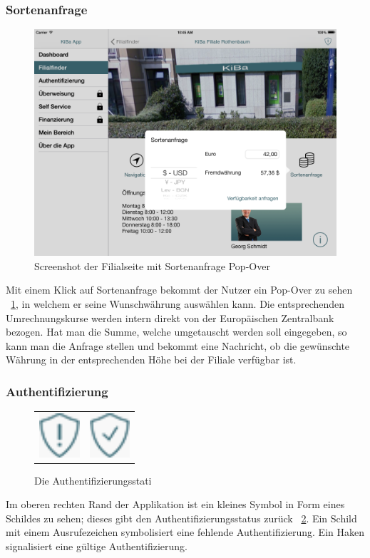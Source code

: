 \subsubsection{Sortenanfrage}
\begin{figure}[h!]
	\centering
	\includegraphics[height=0.25\textheight]{Pictures/Sortenanfrage}
	\vspace{-12pt}
	\caption{Screenshot der Filialseite mit Sortenanfrage Pop-Over}
	\label{fig3}
\end{figure}
	Mit einem Klick auf Sortenanfrage bekommt der Nutzer ein Pop-Over zu sehen ~\ref{fig3}, in welchem er seine Wunschwährung auswählen kann. Die entsprechenden Umrechnungskurse werden intern direkt von der Europäischen Zentralbank bezogen. Hat man die Summe, welche umgetauscht werden soll eingegeben, so kann man die Anfrage stellen und bekommt eine Nachricht, ob die gewünschte Währung in der entsprechenden Höhe bei der Filiale verfügbar ist.

\subsubsection{Authentifizierung}
\begin{figure}[h!]
    \centering
	\begin{tabular}{@{}cc@{}}
        	\includegraphics[width=1.5cm]{Pictures/notauth} &
    		\includegraphics[width=1.5cm]{Pictures/authed}
    \end{tabular}
	\caption{Die Authentifizierungsstati\label{fig4}}
\end{figure}
\noindent	Im oberen rechten Rand der Applikation ist ein kleines Symbol in Form eines Schildes zu sehen; dieses gibt den Authentifizierungsstatus zurück ~\ref{fig4}. Ein Schild mit einem Ausrufezeichen symbolisiert eine fehlende Authentifizierung. Ein Haken signalisiert eine gültige Authentifizierung.

